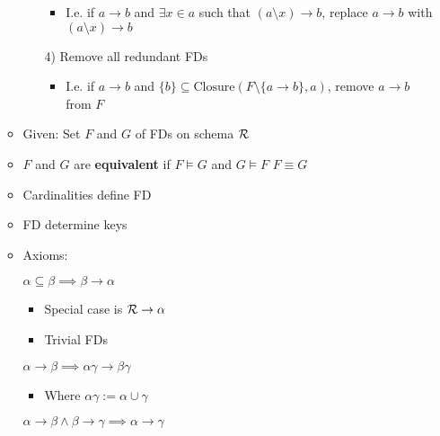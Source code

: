 \begin{itemize}
\begin{itemize}
\begin{itemize}
\begin{itemize}
                            \item I.e. if $a \to b$ and $\exists x \in a$ such that $(a \setminus x) \to b$, replace $a \to b$ with $(a \setminus x) \to b$
                        \end{itemize}
                    \item[4)] Remove all redundant FDs
                        \begin{itemize}
                            \item I.e. if $a \to b$ and $\{b\} \subseteq \text{Closure}(F \setminus \{a \to b\}, a)$, remove $a \to b$ from $F$
                        \end{itemize}
                \end{itemize}
        \end{itemize}
        \begin{itemize}
            \item Given: Set $F$ and $G$ of FDs on schema $\mathcal{R}$
            \item $F$ and $G$ are \textbf{equivalent} if $F \models G$ and $G \models F$
             $F \equiv G$
    \item Cardinalities define FD
    \item FD determine keys
        \end{itemize}
        \begin{itemize}
            \item Axioms:
                \begin{itemize}
                     $\alpha \subseteq \beta \implies \beta \to \alpha$
                        \begin{itemize}
                            \item Special case is $\mathcal{R} \to \alpha$
                            \item Trivial FDs
                        \end{itemize}
                     $\alpha \to \beta \implies \alpha \gamma \to \beta \gamma$
                        \begin{itemize}
                            \item Where $\alpha \gamma := \alpha \cup \gamma$
                        \end{itemize}
                     $\alpha \to \beta \wedge \beta \to \gamma \implies \alpha \to \gamma$
                \end{itemize}

\end{itemize}
\end{itemize}
